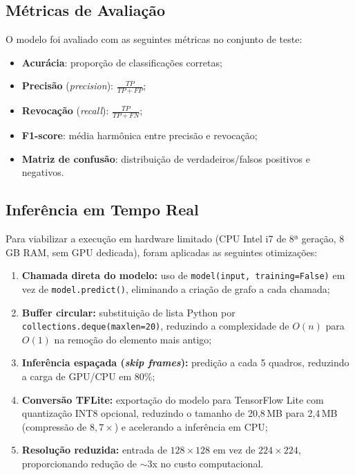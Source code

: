 \documentclass[12pt,a4paper]{article}
\begin{document}
\subsection{Métricas de Avaliação}

O modelo foi avaliado com as seguintes métricas no conjunto de teste:
\begin{itemize}[nosep]
  \item \textbf{Acurácia}: proporção de classificações corretas;
  \item \textbf{Precisão} (\textit{precision}): $\frac{TP}{TP + FP}$;
  \item \textbf{Revocação} (\textit{recall}): $\frac{TP}{TP + FN}$;
  \item \textbf{F1-score}: média harmônica entre precisão e revocação;
  \item \textbf{Matriz de confusão}: distribuição de verdadeiros/falsos positivos e negativos.
\end{itemize}

\subsection{Inferência em Tempo Real}

Para viabilizar a execução em hardware limitado (CPU Intel i7 de 8ª geração, 8\,GB RAM, sem GPU dedicada), foram aplicadas as seguintes otimizações:

\begin{enumerate}[nosep]
  \item \textbf{Chamada direta do modelo:} uso de \texttt{model(input, training=False)} em vez de \texttt{model.predict()}, eliminando a criação de grafo a cada chamada;
  \item \textbf{Buffer circular:} substituição de lista Python por \texttt{collections.deque(maxlen=20)}, reduzindo a complexidade de $O(n)$ para $O(1)$ na remoção do elemento mais antigo;
  \item \textbf{Inferência espaçada (\textit{skip frames}):} predição a cada 5 quadros, reduzindo a carga de GPU/CPU em 80\%;
  \item \textbf{Conversão TFLite:} exportação do modelo para TensorFlow Lite com quantização INT8 opcional, reduzindo o tamanho de 20,8\,MB para 2,4\,MB (compressão de $8{,}7\times$) e acelerando a inferência em CPU;
  \item \textbf{Resolução reduzida:} entrada de $128 \times 128$ em vez de $224 \times 224$, proporcionando redução de $\sim$3x no custo computacional.
\end{enumerate}
\end{document}
